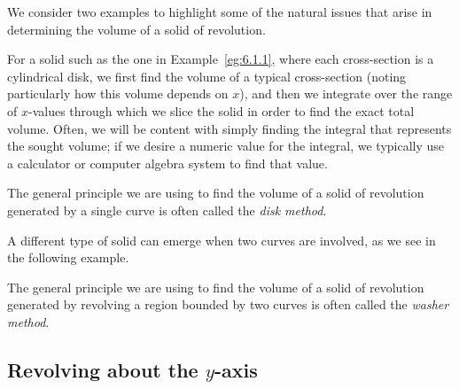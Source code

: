 We consider two examples to highlight some of the natural issues that arise in determining the volume of a solid of revolution.


For a solid such as the one in Example~\ref{eg:6.1.1}, where each cross-section is a cylindrical disk, we first find the volume of a typical cross-section (noting particularly how this volume depends on $x$), and then we integrate over the range of $x$-values through which we slice the solid in order to find the exact total volume.  Often, we will be content with simply finding the integral that represents the sought volume; if we desire a numeric value for the integral, we typically use a calculator or computer algebra system to find that value.

The general principle we are using to find the volume of a solid of revolution generated by a single curve is often called the \emph{disk method}.



A different type of solid can emerge when two curves are involved, as we see in the following example.


The general principle we are using to find the volume of a solid of revolution generated by revolving a region bounded by two curves is often called the \emph{washer method}.



\subsection*{Revolving about the $y$-axis}

